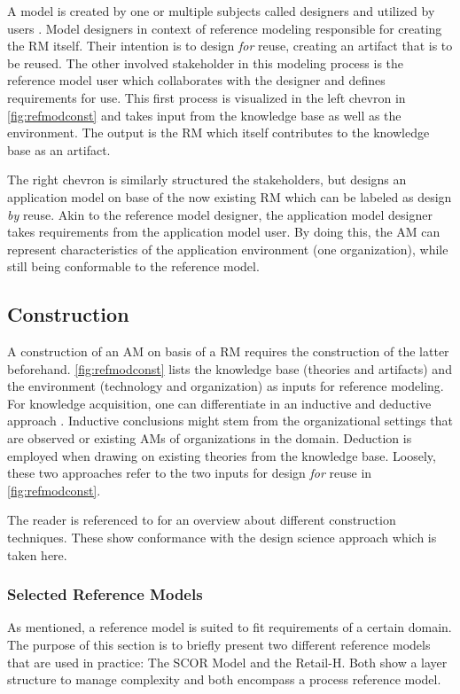 		A model is created by one or multiple subjects called designers and utilized by users \citep{becker2004handelsinformationssysteme}. Model designers in context of reference modeling responsible for creating the \acrshort{RM} itself. Their intention is to design \textit{for} reuse, \ie creating an artifact that is to be reused. The other involved stakeholder in this modeling process is the reference model user which collaborates with the designer and defines requirements for use. This first process is visualized in the left chevron in \Fig \ref{fig:refmodconst} and takes input from the knowledge base as well as the environment. The output is the  \acrshort{RM} which itself contributes to the knowledge base as an artifact. 
		
		The right chevron is similarly structured \wrt the stakeholders, but designs an application model on base of the now existing \acrshort{RM} which can be labeled as design \textit{by} reuse. Akin to the reference model designer, the application model designer takes requirements from the application model user. By doing this, the  \acrshort{AM} can represent characteristics of the application environment (\ie one organization), while still being conformable to the reference model. 
		
		\subsection{Construction}
		A construction of an \acrshort{AM} on basis of a \acrshort{RM} requires the construction of the latter beforehand. 
		\Fig \ref{fig:refmodconst} lists the knowledge base (theories and artifacts) and the environment (technology and organization) as inputs for reference modeling. For knowledge acquisition, one can differentiate in an inductive and deductive approach \citep{thomas2006mang}. Inductive conclusions  might stem from the organizational settings that are observed or existing \acrshort{AM}s of organizations in the domain. Deduction is employed when drawing on existing theories from the knowledge base. Loosely, these two approaches refer to the two inputs for design \textit{for} reuse in \Fig \ref{fig:refmodconst}. 
		
		The reader is referenced to \cite{Fettke2014meth} for an overview about different construction techniques. These show conformance with the design science approach \citep[]{Puster2015} which is taken here. 
		
		
		\subsubsection{Selected Reference Models}
		\label{mod:scor}
		As mentioned, a reference model is suited to fit requirements of a certain domain. The purpose of this section is to briefly present two different reference models that are used in practice: The \acrfull{SCOR} Model and the Retail-H. Both show a layer structure to manage complexity and both encompass a process reference model. 
		
